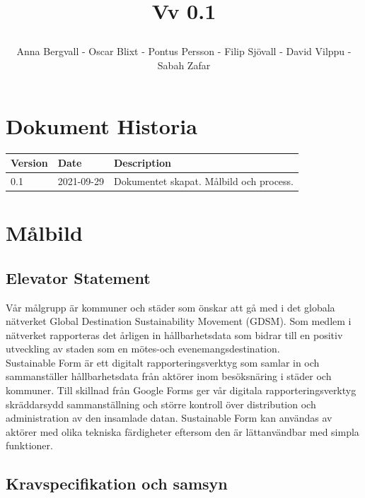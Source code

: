\documentclass{article}
\date {#1}
\title {
    \documentNumber {01}    

    \documentTitle {Helsingborg Event and Convention Bureau}
    
    \documentDate {2021-09-29}
    \documentVersion Vv 0.1
    
    \author{Anna Bergvall - Oscar Blixt - Pontus Persson - Filip Sjövall - David Vilppu - Sabah Zafar}
}
\begin{document}
\maketitle

\thispagestyle{empty}



\newpage

\tableofcontents


\newpage

\section{Dokument Historia}
\begin{tabular}{ l | l | l }
    Version & Date & Description \\
    \hline
    0.1 & 2021-09-29 & Dokumentet skapat. Målbild och process. \\
    \hline
   
\end{tabular}

\newpage

\section{Målbild}
\subsection{Elevator Statement}


Vår målgrupp är kommuner och städer som önskar att gå med i det globala nätverket Global
Destination Sustainability Movement (GDSM). Som medlem i nätverket rapporteras det
årligen in hållbarhetsdata som bidrar till en positiv utveckling av staden som en mötes-och
evenemangsdestination. \\ \indent Sustainable Form är ett digitalt rapporteringsverktyg som samlar in
och sammanställer hållbarhetsdata från aktörer inom besöksnäring i städer och kommuner.
Till skillnad från Google Forms ger vår digitala rapporteringsverktyg skräddarsydd
sammanställning och större kontroll över distribution och administration av den insamlade
datan. Sustainable Form kan användas av aktörer med olika tekniska färdigheter eftersom den
är lättanvändbar med simpla funktioner.

\subsection{Kravspecifikation och samsyn}
\end{document}
